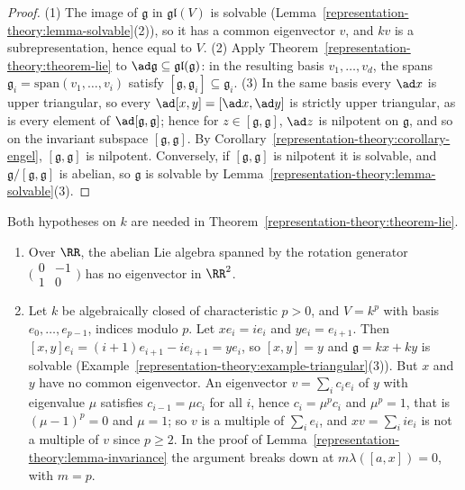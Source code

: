 \begin{proof}
(1) The image of $\mathfrak{g}$ in $\mathfrak{gl}(V)$ is solvable (Lemma~\ref{representation-theory:lemma-solvable}(2)), so it has a common eigenvector $v$, and $kv$ is a
subrepresentation, hence equal to $V$. (2) Apply Theorem~\ref{representation-theory:theorem-lie} to $\ad\mathfrak{g} \subseteq \mathfrak{gl}(\mathfrak{g})$: in the
resulting basis $v_1, \ldots, v_d$, the spans $\mathfrak{g}_i = \mathrm{span}(v_1, \ldots, v_i)$ satisfy $[\mathfrak{g}, \mathfrak{g}_i] \subseteq \mathfrak{g}_i$. (3) In
the same basis every $\ad x$ is upper triangular, so every $\ad[x, y] = [\ad x, \ad y]$ is strictly upper triangular, as is every element of
$\ad[\mathfrak{g}, \mathfrak{g}]$; hence for $z \in [\mathfrak{g}, \mathfrak{g}]$, $\ad z$ is nilpotent on $\mathfrak{g}$, and so on the invariant subspace
$[\mathfrak{g}, \mathfrak{g}]$. By Corollary~\ref{representation-theory:corollary-engel}, $[\mathfrak{g}, \mathfrak{g}]$ is nilpotent. Conversely, if
$[\mathfrak{g}, \mathfrak{g}]$ is nilpotent it is solvable, and $\mathfrak{g}/[\mathfrak{g}, \mathfrak{g}]$ is abelian, so $\mathfrak{g}$ is solvable by
Lemma~\ref{representation-theory:lemma-solvable}(3).
\end{proof}

\begin{counterexample}\label{representation-theory:counterexample-lie}
Both hypotheses on $k$ are needed in Theorem~\ref{representation-theory:theorem-lie}.
\begin{enumerate}
\item Over $\RR$, the abelian Lie algebra spanned by the rotation generator $\bigl(\begin{smallmatrix} 0 & -1\\ 1 & 0\end{smallmatrix}\bigr)$ has no eigenvector in
$\RR^2$.
\item Let $k$ be algebraically closed of characteristic $p > 0$, and $V = k^p$ with basis $e_0, \ldots, e_{p-1}$, indices modulo $p$. Let $xe_i = ie_i$ and
$ye_i = e_{i+1}$. Then $[x, y]e_i = (i + 1)e_{i+1} - ie_{i+1} = ye_i$, so $[x, y] = y$ and $\mathfrak{g} = kx + ky$ is solvable
(Example~\ref{representation-theory:example-triangular}(3)). But $x$ and $y$ have no common eigenvector. An eigenvector $v = \sum_ic_ie_i$ of $y$ with eigenvalue $\mu$
satisfies $c_{i-1} = \mu c_i$ for all $i$, hence $c_i = \mu^{p}c_i$ and $\mu^p = 1$, that is $(\mu - 1)^p = 0$ and $\mu = 1$; so $v$ is a multiple of
$\sum_ie_i$, and $xv = \sum_iie_i$ is not a multiple of $v$ since $p \geq 2$. In the proof of Lemma~\ref{representation-theory:lemma-invariance} the argument
breaks down at $m\lambda([a, x]) = 0$, with $m = p$.
\end{enumerate}
\end{counterexample}

